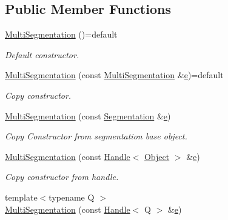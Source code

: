\subsection*{Public Member Functions}
\begin{DoxyCompactItemize}
\item 
\hyperlink{class_d_d4hep_1_1_geometry_1_1_multi_segmentation_a89463bebeaec219634fa938b897b5f00}{Multi\+Segmentation} ()=default
\begin{DoxyCompactList}\small\item\em Default constructor. \end{DoxyCompactList}\item 
\hyperlink{class_d_d4hep_1_1_geometry_1_1_multi_segmentation_a75d9bc57ccfcaf62c63a18f755197264}{Multi\+Segmentation} (const \hyperlink{class_d_d4hep_1_1_geometry_1_1_multi_segmentation}{Multi\+Segmentation} \&\hyperlink{_volumes_8cpp_a8a9a1f93e9b09afccaec215310e64142}{e})=default
\begin{DoxyCompactList}\small\item\em Copy constructor. \end{DoxyCompactList}\item 
\hyperlink{class_d_d4hep_1_1_geometry_1_1_multi_segmentation_ae419654849efd81b60901d521924244c}{Multi\+Segmentation} (const \hyperlink{class_d_d4hep_1_1_geometry_1_1_segmentation}{Segmentation} \&\hyperlink{_volumes_8cpp_a8a9a1f93e9b09afccaec215310e64142}{e})
\begin{DoxyCompactList}\small\item\em Copy Constructor from segmentation base object. \end{DoxyCompactList}\item 
\hyperlink{class_d_d4hep_1_1_geometry_1_1_multi_segmentation_a7ce624da1104ebe6d35c0cfa2d75aaad}{Multi\+Segmentation} (const \hyperlink{class_d_d4hep_1_1_handle}{Handle}$<$ \hyperlink{class_d_d4hep_1_1_geometry_1_1_multi_segmentation_ab30207d7b5e4366c7227de5743a88452}{Object} $>$ \&\hyperlink{_volumes_8cpp_a8a9a1f93e9b09afccaec215310e64142}{e})
\begin{DoxyCompactList}\small\item\em Copy constructor from handle. \end{DoxyCompactList}\item 
{\footnotesize template$<$typename Q $>$ }\\\hyperlink{class_d_d4hep_1_1_geometry_1_1_multi_segmentation_a708cf7024e574b5d91cba0db3737f6b3}{Multi\+Segmentation} (const \hyperlink{class_d_d4hep_1_1_handle}{Handle}$<$ Q $>$ \&\hyperlink{_volumes_8cpp_a8a9a1f93e9b09afccaec215310e64142}{e})

\end{DoxyCompactItemize}
